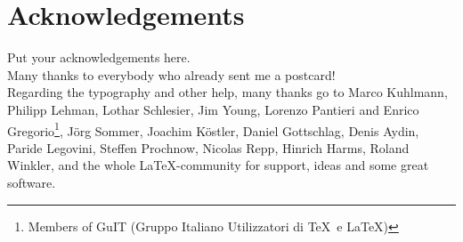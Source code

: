 




\manualmark
\markboth{\spacedlowsmallcaps{\bibname}}{\spacedlowsmallcaps{\bibname}} 


\begingroup

\let\clearpage\relax
\let\cleardoublepage\relax
\let\cleardoublepage\relax

\chapter*{Acknowledgements} %

Put your acknowledgements here.\\

\noindent Many thanks to everybody who already sent me a postcard!\\

\noindent Regarding the typography and other help, many thanks go to Marco Kuhlmann, Philipp Lehman, Lothar Schlesier, Jim Young, Lorenzo Pantieri and Enrico Gregorio\footnote{Members of GuIT (Gruppo Italiano Utilizzatori di \TeX\ e \LaTeX )}, J\"org Sommer, Joachim K\"ostler, Daniel Gottschlag, Denis Aydin, Paride Legovini, Steffen Prochnow, Nicolas Repp, Hinrich Harms, Roland Winkler,  and the whole \LaTeX-community for support, ideas and some great software.

